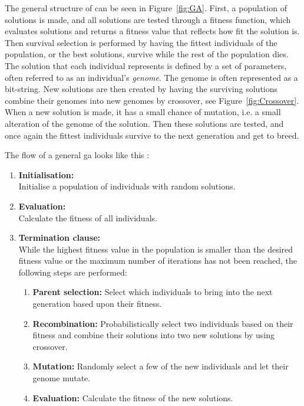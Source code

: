 The general structure of  can be seen in Figure~\ref{fig:GA}. First, a population of solutions is made, and all solutions are tested through a fitness function, which evaluates solutions and returns a fitness value that reflects how fit the solution is. Then survival selection is performed by having the fittest individuals of the population, or the best solutions, survive while the rest of the population dies. The solution that each individual represents is defined by a set of parameters, often referred to as an individual’s \textit{genome}. The genome is often represented as a bit-string. New solutions are then created by having the surviving solutions combine their genomes into new genomes by crossover, see Figure~\ref{fig:Crossover}. When a new solution is made, it has a small chance of mutation, i.e. a small alteration of the genome of the solution. Then these solutions are tested, and once again the fittest individuals survive to the next generation and get to breed.

The flow of a general \ac{ga} looks like this \citep{michalski2013machine}:
\begin{enumerate}[noitemsep]
    \item \textbf{Initialisation:}\\Initialise a population of individuals with random solutions.
    \item \textbf{Evaluation:} \\Calculate the fitness of all individuals.
    \item \textbf{Termination clause:}\\While the highest fitness value in the population is smaller than the desired fitness value or the maximum number of iterations has not been reached, the following steps are performed:
    \begin{enumerate}
        \item \textbf{Parent selection:} Select which individuals to bring into the next generation based upon their fitness.
        \item \textbf{Recombination:} Probabilistically select two individuals based on their fitness and combine their solutions into two new solutions by using crossover.
        \item \textbf{Mutation:} Randomly select a few of the new individuals and let their genome mutate.
        \item \textbf{Evaluation:} Calculate the fitness of the new solutions.
    \end{enumerate}
\end{enumerate}


